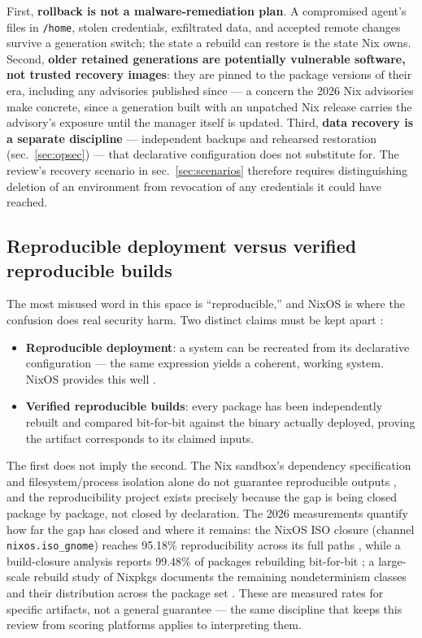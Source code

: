 \documentclass[
  english,
  9pt,
]{extarticle}
\providecommand{\tightlist}{%
  \setlength{\itemsep}{0pt}\setlength{\parskip}{0pt}}
\begin{document}
First, \textbf{rollback is not a malware-remediation plan}. A
compromised agent's files in \texttt{/home}, stolen credentials,
exfiltrated data, and accepted remote changes survive a generation
switch; the state a rebuild can restore is the state Nix owns. Second,
\textbf{older retained generations are potentially vulnerable software,
not trusted recovery images}: they are pinned to the package versions of
their era, including any advisories published since --- a concern the
2026 Nix advisories make concrete, since a generation built with an
unpatched Nix release carries the advisory's exposure until the manager
itself is updated. Third, \textbf{data recovery is a separate
discipline} --- independent backups and rehearsed restoration
(sec.~\ref{sec:opsec}) --- that declarative configuration does not
substitute for. The review's recovery scenario in
sec.~\ref{sec:scenarios} therefore requires distinguishing deletion of
an environment from revocation of any credentials it could have reached.

\subsection{Reproducible deployment versus verified reproducible
builds}\label{reproducible-deployment-versus-verified-reproducible-builds}

The most misused word in this space is ``reproducible,'' and NixOS is
where the confusion does real security harm. Two distinct claims must be
kept apart \citep{nixos_reproducibility}:

\begin{itemize}
\tightlist
\item
  \textbf{Reproducible deployment}: a system can be recreated from its
  declarative configuration --- the same expression yields a coherent,
  working system. NixOS provides this well \citep{nixos_wiki}.
\item
  \textbf{Verified reproducible builds}: every package has been
  independently rebuilt and compared bit-for-bit against the binary
  actually deployed, proving the artifact corresponds to its claimed
  inputs.
\end{itemize}

The first does not imply the second. The Nix sandbox's dependency
specification and filesystem/process isolation alone do not guarantee
reproducible outputs \citep{nix_sandbox_config, nixos_reproducibility},
and the reproducibility project exists precisely because the gap is
being closed package by package, not closed by declaration. The 2026
measurements quantify how far the gap has closed and where it remains:
the NixOS ISO closure (channel \texttt{nixos.iso\_gnome}) reaches
95.18\% reproducibility across its full paths
\citep{nixos_reproducibility_iso}, while a build-closure analysis
reports 99.48\% of packages rebuilding bit-for-bit
\citep{nixos_reproducibility_iso}; a large-scale rebuild study of
Nixpkgs documents the remaining nondeterminism classes and their
distribution across the package set \citep{reproducible_study_2025}.
These are measured rates for specific artifacts, not a general guarantee
--- the same discipline that keeps this review from scoring platforms
applies to interpreting them.
\end{document}
